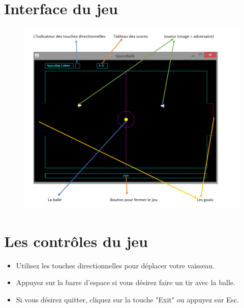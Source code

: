 \newpage

\section{Interface du jeu}
\begin{figure}[!h]
\begin{center}
\includegraphics[width=20cm]{./InterfaceGraph}
\end{center}
\end{figure}

\section {Les contrôles du jeu}

\begin{itemize}
\item Utilisez les touches directionnelles pour déplacer votre vaisseau.
\item Appuyez sur la barre d'espace si vous désirez faire un tir avec la balle.
\item Si vous désirez quitter, cliquez sur la touche "Exit" ou appuyez sur Esc.
\end{itemize}

